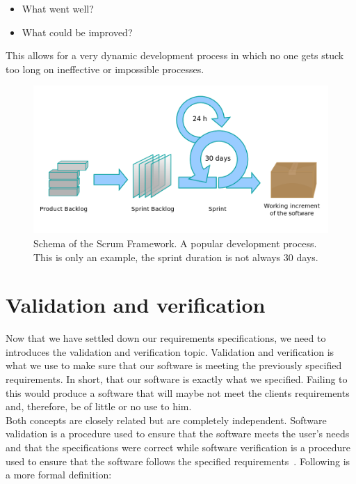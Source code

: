 \documentclass[12pt]{article}
\theoremstyle{definition}
\theoremstyle{definition}
\theoremstyle{remark}
\begin{document}
\begin{itemize}
\item What went well?
\item What could be improved?
\end{itemize}

This allows for a very dynamic development process in which no one gets stuck too long on ineffective or impossible processes.

\begin{figure}
    \centering
    \includegraphics[scale=0.4]{scrum.png}
    \caption{Schema of the Scrum Framework. A popular development process. This is only an example, the sprint duration is not always 30 days.}
    \label{Scrum}
\end{figure}



\section{Validation and verification}


Now that we have settled down our requirements specifications, we need to introduces the validation and verification topic. Validation and verification is what we use to make sure that our software is meeting the previously specified requirements. In short, that our software is exactly what we specified. Failing to this would produce a software that will maybe not meet the clients requirements and, therefore, be of little or no use to him.\\

Both concepts are closely related but are completely independent. Software validation is a procedure used to ensure that the software meets the user's needs and that the specifications were correct while software verification is a procedure used to ensure that the software follows the specified requirements~\cite{VnV:2016}. Following is a more formal definition:
\end{document}
